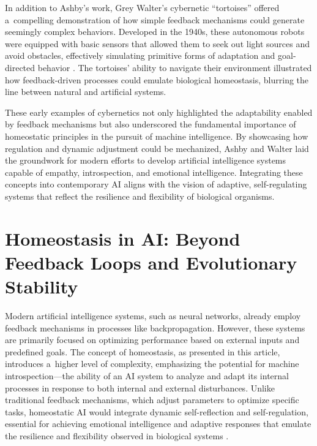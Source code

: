 \documentclass[%
  manuscript=article,
  year=2024,
  volume=77,
  doi=10.59203/zfn.77.706,
]{zfn}
\begin{document}
In addition to Ashby's work, Grey Walter's cybernetic ``tortoises'' offered a~compelling demonstration of how simple feedback mechanisms could generate seemingly complex behaviors. Developed in the 1940s, these autonomous robots were equipped with basic sensors that allowed them to seek out light sources and avoid obstacles, effectively simulating primitive forms of adaptation and goal-directed behavior 
\parencite[][]{walter_imitation_1950}. %
 The tortoises' ability to navigate their environment illustrated how feedback-driven processes could emulate biological homeostasis, blurring the line between natural and artificial systems.



These early examples of cybernetics not only highlighted the adaptability enabled by feedback mechanisms but also underscored the fundamental importance of homeostatic principles in the pursuit of machine intelligence. By showcasing how regulation and dynamic adjustment could be mechanized, Ashby and Walter laid the groundwork for modern efforts to develop artificial intelligence systems capable of empathy, introspection, and emotional intelligence. Integrating these concepts into contemporary AI aligns with the vision of adaptive, self-regulating systems that reflect the resilience and flexibility of biological organisms.



\section*{Homeostasis in AI: Beyond Feedback Loops and Evolutionary Stability}

Modern artificial intelligence systems, such as neural networks, already employ feedback mechanisms in processes like backpropagation. However, these systems are primarily focused on optimizing performance based on external inputs and predefined goals. The concept of homeostasis, as presented in this article, introduces a~higher level of complexity, emphasizing the potential for machine introspection---the ability of an AI system to analyze and adapt its internal processes in response to both internal and external disturbances. Unlike traditional feedback mechanisms, which adjust parameters to optimize specific tasks, homeostatic AI would integrate dynamic self-reflection and self-regulation, essential for achieving emotional intelligence and adaptive responses that emulate the resilience and flexibility observed in biological systems 
\parencites[][]{damasio_nature_2013}[][]{gros_emotions_2021}.%
\end{document}
